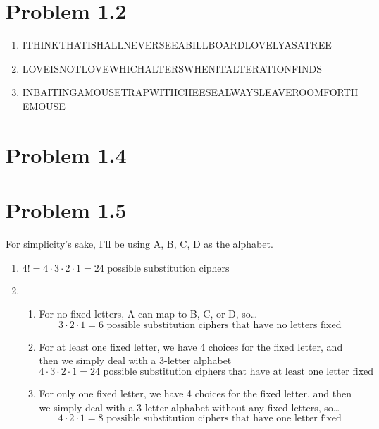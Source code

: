 \documentclass{article}
\author{Isaac Boaz}
\begin{document}
\section*{Problem 1.2}
\begin{enumerate}[label=(\alph*)]
    \item ITHINKTHATISHALLNEVERSEEABILLBOARDLOVELYASATREE
    \item LOVEISNOTLOVEWHICHALTERSWHENITALTERATIONFINDS
    \item INBAITINGAMOUSETRAPWITHCHEESEALWAYSLEAVEROOMFORTHEMOUSE 
\end{enumerate}

\section*{Problem 1.4}

\section*{Problem 1.5}
For simplicity's sake, I'll be using A, B, C, D as the alphabet.
\begin{enumerate}[label=(\alph*)]
    \item \(4! = 4 \cdot 3 \cdot 2 \cdot 1 = 24 \text{ possible substitution ciphers}\)
    \item \begin{enumerate}[label=(\roman*)]
        \item For no fixed letters, A can map to B, C, or D, so\dots
        \begin{equation*}
            3 \cdot 2 \cdot 1 = 6 \text { possible substitution ciphers that have no letters fixed}
        \end{equation*}
        \item For at least one fixed letter, we have 4 choices for the fixed letter, and then we simply deal with a 3-letter alphabet
        \begin{equation*}
            4 \cdot 3 \cdot 2 \cdot 1 = 24 \text { possible substitution ciphers that have at least one letter fixed}
        \end{equation*}
        \item For only one fixed letter, we have 4 choices for the fixed letter, and then we simply deal with a 3-letter alphabet
        without any fixed letters, so\dots
        \begin{equation*}
            4 \cdot 2 \cdot 1 = 8 \text { possible substitution ciphers that have one letter fixed}
        \end{equation*}
    \end{enumerate}
\end{enumerate}
\end{document}
